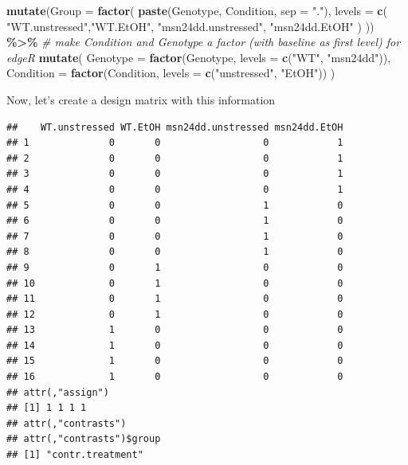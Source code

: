 \documentclass[
]{book}
\newenvironment{Shaded}{\begin{snugshade}}{\end{snugshade}}
\newcommand{\AttributeTok}[1]{\textcolor[rgb]{0.13,0.29,0.53}{#1}}
\newcommand{\CommentTok}[1]{\textcolor[rgb]{0.56,0.35,0.01}{\textit{#1}}}
\newcommand{\DecValTok}[1]{\textcolor[rgb]{0.00,0.00,0.81}{#1}}
\newcommand{\FunctionTok}[1]{\textcolor[rgb]{0.13,0.29,0.53}{\textbf{#1}}}
\newcommand{\NormalTok}[1]{#1}
\newcommand{\OtherTok}[1]{\textcolor[rgb]{0.56,0.35,0.01}{#1}}
\newcommand{\SpecialCharTok}[1]{\textcolor[rgb]{0.81,0.36,0.00}{\textbf{#1}}}
\newcommand{\StringTok}[1]{\textcolor[rgb]{0.31,0.60,0.02}{#1}}
\begin{document}
\begin{Shaded}
\begin{Highlighting}[]
  \FunctionTok{mutate}\NormalTok{(}\AttributeTok{Group =} \FunctionTok{factor}\NormalTok{(}
    \FunctionTok{paste}\NormalTok{(Genotype, Condition, }\AttributeTok{sep =} \StringTok{"."}\NormalTok{),}
    \AttributeTok{levels =} \FunctionTok{c}\NormalTok{(}
      \StringTok{"WT.unstressed"}\NormalTok{,}\StringTok{"WT.EtOH"}\NormalTok{,}
      \StringTok{"msn24dd.unstressed"}\NormalTok{, }\StringTok{"msn24dd.EtOH"}
\NormalTok{    )}
\NormalTok{  )) }\SpecialCharTok{\%\textgreater{}\%}
  \CommentTok{\# make Condition and Genotype a factor (with baseline as first level) for edgeR}
  \FunctionTok{mutate}\NormalTok{(}
    \AttributeTok{Genotype =} \FunctionTok{factor}\NormalTok{(Genotype,}
                      \AttributeTok{levels =} \FunctionTok{c}\NormalTok{(}\StringTok{"WT"}\NormalTok{, }\StringTok{"msn24dd"}\NormalTok{)),}
    \AttributeTok{Condition =} \FunctionTok{factor}\NormalTok{(Condition,}
                       \AttributeTok{levels =} \FunctionTok{c}\NormalTok{(}\StringTok{"unstressed"}\NormalTok{, }\StringTok{"EtOH"}\NormalTok{))}
\NormalTok{  )}
\end{Highlighting}
\end{Shaded}

Now, let's create a design matrix with this information

\begin{Shaded}
\end{Shaded}

\begin{verbatim}
##    WT.unstressed WT.EtOH msn24dd.unstressed msn24dd.EtOH
## 1              0       0                  0            1
## 2              0       0                  0            1
## 3              0       0                  0            1
## 4              0       0                  0            1
## 5              0       0                  1            0
## 6              0       0                  1            0
## 7              0       0                  1            0
## 8              0       0                  1            0
## 9              0       1                  0            0
## 10             0       1                  0            0
## 11             0       1                  0            0
## 12             0       1                  0            0
## 13             1       0                  0            0
## 14             1       0                  0            0
## 15             1       0                  0            0
## 16             1       0                  0            0
## attr(,"assign")
## [1] 1 1 1 1
## attr(,"contrasts")
## attr(,"contrasts")$group
## [1] "contr.treatment"
\end{verbatim}
\end{document}
